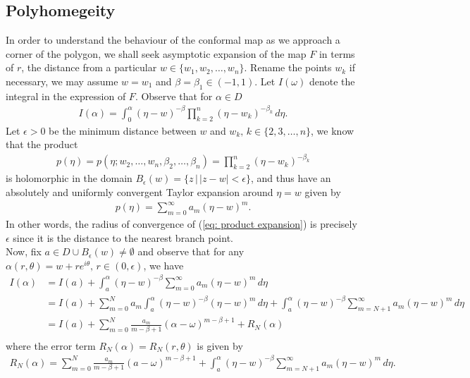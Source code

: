 \documentclass{article}
\begin{document}
\subsection{Polyhomegeity} 
In order to understand the behaviour of the conformal map as we approach a corner of the polygon, we shall seek asymptotic expansion of the map $F$ in terms of $r$, the distance from a particular $w \in \{w_1, w_2, \dots, w_n\}$. Rename the points $w_k$ if necessary, we may assume $w = w_1$ and $\beta = \beta_1 \in (-1, 1)$. Let $I(\omega)$ denote the integral in the expression of $F$. Observe that for $\alpha \in D$
\begin{align*}
I(\alpha) = \int_0^\alpha (\eta - w)^{-\beta} \prod_{k = 2}^n (\eta - w_k)^{-\beta_k} \, d\eta. 
\end{align*}
Let $\epsilon > 0 $ be the minimum distance between $w$ and $w_k, \, k  \in \{2, 3, \dots, n\}$, we know that the product
\begin{align*}
p(\eta) = p(\eta; w_2, \dots, w_n, \beta_2, \dots, \beta_n) = \prod_{k = 2}^n (\eta - w_k)^{-\beta_k} 
\end{align*}
is holomorphic in the domain $B_\epsilon(w) = \{z\, |\, |z - w| < \epsilon\}$, and thus have an absolutely and uniformly convergent Taylor expansion around $\eta = w$ given by 
\begin{align} \label{eq: product expansion} 
p(\eta) = \sum_{m = 0}^\infty a_m (\eta - w)^m. 
\end{align}
In other words, the radius of convergence of (\ref{eq: product expansion}) is precisely $\epsilon$ since it is the distance to the nearest branch point. \\
\noindent Now, fix $a \in D \cup B_\epsilon(w) \neq \emptyset$ and observe that for any $\alpha(r, \theta) = w + re^{i \theta}, \, r \in (0, \epsilon)$, we have 
\begin{align*}
I(\alpha) 
&= I(a) + \int_a^\alpha (\eta - w)^{-\beta} \sum_{m = 0}^\infty a_m (\eta - w)^m \, d\eta \\
&= I(a) + \sum_{m = 0}^N  a_m \int_a^\alpha (\eta - w)^{-\beta}   (\eta - w)^m \, d\eta +  \int_a^\alpha (\eta - w)^{-\beta} \sum_{m = N + 1}^\infty a_m (\eta - w)^m \, d\eta \\ 
&= I(a) + \sum_{m = 0}^N  \frac{a_m}{m - \beta + 1} (\alpha - \omega)^{m - \beta + 1} + R_N(\alpha) \\
\end{align*}
where the error term $R_N(\alpha) = R_N(r, \theta)$ is given by 
\begin{align*}
R_N(\alpha) = \sum_{m = 0}^N \frac{a_m}{m - \beta + 1} (a - \omega)^{m - \beta + 1} +  \int_a^\alpha (\eta - w)^{-\beta} \sum_{m = N + 1}^\infty a_m (\eta - w)^m \, d\eta. 
\end{align*}
\end{document}
